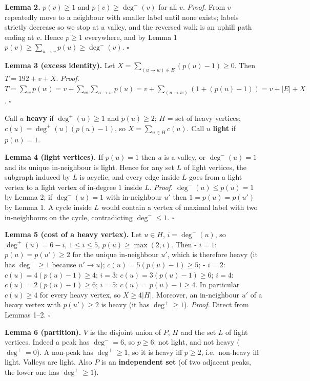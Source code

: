 \textbf{Lemma 2.} \(p(v)\ge1\) and \(p(v)\ge\deg^-(v)\) for all \(v\).
\emph{Proof.} From \(v\) repeatedly move to a neighbour with smaller
label until none exists; labels strictly decrease so we stop at a
valley, and the reversed walk is an uphill path ending at \(v\). Hence
\(p\ge1\) everywhere, and by Lemma 1
\(p(v)\ge\sum_{u\to v}p(u)\ge\deg^-(v)\). \(\square\)

\textbf{Lemma 3 (excess identity).} Let
\(X=\sum_{(u\to w)\in E}(p(u)-1)\ge0\). Then \(T=192+v+X\).
\emph{Proof.}
\(T=\sum_w p(w)=v+\sum_w\sum_{u\to w}p(u)=v+\sum_{(u\to w)}(1+(p(u)-1))=v+|E|+X\).
\(\square\)

Call \(u\) \textbf{heavy} if \(\deg^+(u)\ge1\) and \(p(u)\ge2\); \(H\) =
set of heavy vertices; \(c(u)=\deg^+(u)(p(u)-1)\), so
\(X=\sum_{u\in H}c(u)\). Call \(u\) \textbf{light} if \(p(u)=1\).

\textbf{Lemma 4 (light vertices).} If \(p(u)=1\) then \(u\) is a valley,
or \(\deg^-(u)=1\) and its unique in-neighbour is light. Hence for any
set \(L\) of light vertices, the subgraph induced by \(L\) is acyclic,
and every edge inside \(L\) goes from a light vertex to a light vertex
of in-degree \(1\) inside \(L\). \emph{Proof.} \(\deg^-(u)\le p(u)=1\)
by Lemma 2; if \(\deg^-(u)=1\) with in-neighbour \(u'\) then
\(1=p(u)=p(u')\) by Lemma 1. A cycle inside \(L\) would contain a vertex
of maximal label with two in-neighbours on the cycle, contradicting
\(\deg^-\le1\). \(\square\)

\textbf{Lemma 5 (cost of a heavy vertex).} Let \(u\in H\),
\(i=\deg^-(u)\), so \(\deg^+(u)=6-i\), \(1\le i\le5\),
\(p(u)\ge\max(2,i)\). Then - \(i=1\): \(p(u)=p(u')\ge2\) for the unique
in-neighbour \(u'\), which is therefore heavy (it has \(\deg^+\ge1\)
because \(u'\to u\)); \(c(u)=5(p(u)-1)\ge5\); - \(i=2\):
\(c(u)=4(p(u)-1)\ge4\); \(i=3\): \(c(u)=3(p(u)-1)\ge6\); \(i=4\):
\(c(u)=2(p(u)-1)\ge6\); \(i=5\): \(c(u)=p(u)-1\ge4\). In particular
\(c(u)\ge4\) for every heavy vertex, so \(X\ge4|H|\). Moreover, an
in-neighbour \(u'\) of a heavy vertex with \(p(u')\ge2\) is heavy (it
has \(\deg^+\ge1\)). \emph{Proof.} Direct from Lemmas 1--2. \(\square\)

\textbf{Lemma 6 (partition).} \(V\) is the disjoint union of \(P\),
\(H\) and the set \(L\) of light vertices. Indeed a peak has
\(\deg^-=6\), so \(p\ge6\): not light, and not heavy (\(\deg^+=0\)). A
non-peak has \(\deg^+\ge1\), so it is heavy iff \(p\ge2\),
i.e.~non-heavy iff light. Valleys are light. Also \(P\) is an
\textbf{independent set} (of two adjacent peaks, the lower one has
\(\deg^+\ge1\)).

